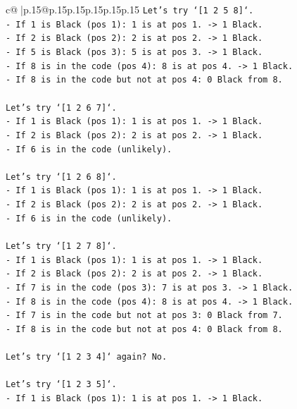 \documentclass{article}
\begin{document}
{\begin{supertabular}{c@{$\;$}|p{.15\linewidth}@{}p{.15\linewidth}p{.15\linewidth}p{.15\linewidth}p{.15\linewidth}p{.15\linewidth}}
{{{\texttt{Let's try `{[}1 2 5 8{]}`.} \\
\texttt{{-} If 1 is Black (pos 1): 1 is at pos 1. {-}> 1 Black.} \\
\texttt{{-} If 2 is Black (pos 2): 2 is at pos 2. {-}> 1 Black.} \\
\texttt{{-} If 5 is Black (pos 3): 5 is at pos 3. {-}> 1 Black.} \\
\texttt{{-} If 8 is in the code (pos 4): 8 is at pos 4. {-}> 1 Black.} \\
\texttt{{-} If 8 is in the code but not at pos 4: 0 Black from 8.} \\
\\ 
\texttt{Let's try `{[}1 2 6 7{]}`.} \\
\texttt{{-} If 1 is Black (pos 1): 1 is at pos 1. {-}> 1 Black.} \\
\texttt{{-} If 2 is Black (pos 2): 2 is at pos 2. {-}> 1 Black.} \\
\texttt{{-} If 6 is in the code (unlikely).} \\
\\ 
\texttt{Let's try `{[}1 2 6 8{]}`.} \\
\texttt{{-} If 1 is Black (pos 1): 1 is at pos 1. {-}> 1 Black.} \\
\texttt{{-} If 2 is Black (pos 2): 2 is at pos 2. {-}> 1 Black.} \\
\texttt{{-} If 6 is in the code (unlikely).} \\
\\ 
\texttt{Let's try `{[}1 2 7 8{]}`.} \\
\texttt{{-} If 1 is Black (pos 1): 1 is at pos 1. {-}> 1 Black.} \\
\texttt{{-} If 2 is Black (pos 2): 2 is at pos 2. {-}> 1 Black.} \\
\texttt{{-} If 7 is in the code (pos 3): 7 is at pos 3. {-}> 1 Black.} \\
\texttt{{-} If 8 is in the code (pos 4): 8 is at pos 4. {-}> 1 Black.} \\
\texttt{{-} If 7 is in the code but not at pos 3: 0 Black from 7.} \\
\texttt{{-} If 8 is in the code but not at pos 4: 0 Black from 8.} \\
\\ 
\texttt{Let's try `{[}1 2 3 4{]}` again? No.} \\
\\ 
\texttt{Let's try `{[}1 2 3 5{]}`.} \\
\texttt{{-} If 1 is Black (pos 1): 1 is at pos 1. {-}> 1 Black.} \\
}}}
\end{supertabular}}
\end{document}
